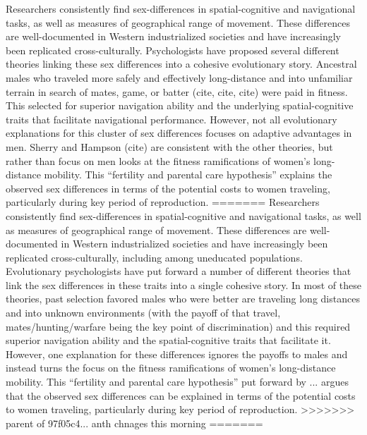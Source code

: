 Researchers consistently find sex-differences in spatial-cognitive and navigational tasks, as well as measures of geographical range of movement.  These differences are well-documented in Western industrialized societies and have increasingly been replicated cross-culturally.  Psychologists have proposed several different theories linking these sex differences into a cohesive evolutionary story.  Ancestral males who traveled more safely and effectively long-distance and into unfamiliar terrain in search of mates, game, or batter (cite, cite, cite) were paid in fitness.  This selected for superior navigation ability and the underlying spatial-cognitive traits that facilitate navigational performance.  However, not all evolutionary explanations for this cluster of sex differences focuses on adaptive advantages in men.  Sherry and Hampson (cite) are consistent with the other theories, but rather than focus on men looks at the fitness ramifications of women's long-distance mobility.  This ``fertility and parental care hypothesis'' explains the observed sex differences in terms of the potential costs to women traveling, particularly during key period of reproduction.
=======
Researchers consistently find sex-differences in spatial-cognitive and navigational tasks, as well as measures of geographical range of movement.  These differences are well-documented in Western industrialized societies and have increasingly been replicated cross-culturally, including among uneducated populations.  Evolutionary psychologists have put forward a number of different theories that link the sex differences in these traits into a single cohesive story.  In most of these theories, past selection favored males who were better are traveling long distances and into unknown environments (with the payoff of that travel, mates/hunting/warfare being the key point of discrimination) and this required superior navigation ability and the spatial-cognitive traits that facilitate it.  However, one explanation for these differences ignores the payoffs to males and instead turns the focus on the fitness ramifications of women's long-distance mobility.  This ``fertility and parental care hypothesis'' put forward by ... argues that the observed sex differences can be explained in terms of the potential costs to women traveling, particularly during key period of reproduction.
>>>>>>> parent of 97f05c4... anth chnages this morning
=======
